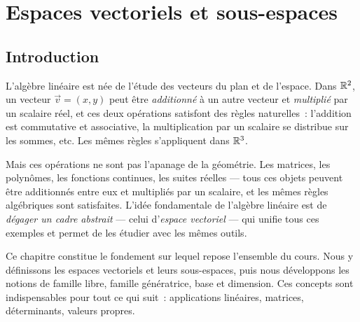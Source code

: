 
\chapter{Espaces vectoriels et sous-espaces}\label{ch:espaces-vectoriels}

\section*{Introduction}

L'algèbre linéaire est née de l'étude des vecteurs du plan et de
l'espace. Dans ${\mathbb{R}}^2$, un vecteur $\vec{v}=(x,y)$ peut être
\emph{additionné} à un autre vecteur et \emph{multiplié} par un
scalaire réel, et ces deux opérations satisfont des règles naturelles~:
l'addition est commutative et associative, la multiplication par un
scalaire se distribue sur les sommes, etc. Les mêmes règles s'appliquent
dans ${\mathbb{R}}^3$.

\medskip

Mais ces opérations ne sont pas l'apanage de la géométrie. Les matrices,
les polynômes, les fonctions continues, les suites réelles --- tous ces
objets peuvent être additionnés entre eux et multipliés par un
scalaire, et les mêmes règles algébriques sont satisfaites. L'idée
fondamentale de l'algèbre linéaire est de \emph{dégager un cadre
abstrait} --- celui d'\emph{espace vectoriel} --- qui unifie tous ces
exemples et permet de les étudier avec les mêmes outils.

\medskip

Ce chapitre constitue le fondement sur lequel repose l'ensemble du
cours. Nous y définissons les espaces vectoriels et leurs sous-espaces,
puis nous développons les notions de famille libre, famille
génératrice, base et dimension. Ces concepts sont indispensables pour
tout ce qui suit~: applications linéaires, matrices, déterminants,
valeurs propres.

\begin{center}
\label{fig:comb-lin-R2}
\end{center}

